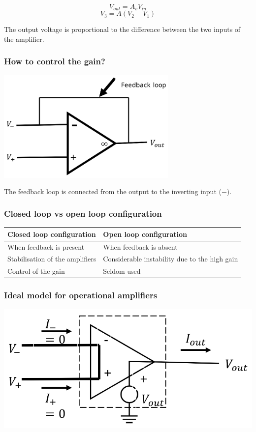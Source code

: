 \documentclass[11pt]{article}
\begin{document}
\[V_{out} = A_v V_{in}\]
\[V_3 = A(V_2 - V_1)\]

The output voltage is proportional to the difference between the two inputs of the amplifier.
\subsubsection{How to control the gain?}
\label{sec:org2ecfc2c}
\begin{center}
\includegraphics[height=15em]{./images/operational-amplifier-feedback-loop-diagram.png}
\end{center}

The feedback loop is connected from the output to the inverting input (\(-\)).
\subsubsection{Closed loop vs open loop configuration}
\label{sec:orgb00e3c3}
\begin{center}
\begin{tabular}{l|l}
Closed loop configuration & Open loop configuration\\
\hline
When feedback is present & When feedback is absent\\
Stabilisation of the amplifiers & Considerable instability due to the high gain\\
Control of the gain & Seldom used\\
\end{tabular}
\end{center}
\subsubsection{Ideal model for operational amplifiers}
\label{sec:org14d4ca1}
\begin{center}
\includegraphics[width=.9\linewidth]{./images/operational-amplifier-equivalent-circuit.png}
\end{center}
\end{document}

